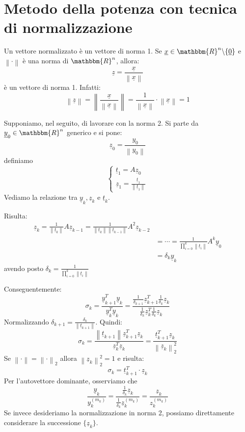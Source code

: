\documentclass[12pt]{report}
\begin{document}
\section{Metodo della potenza con tecnica di normalizzazione}
\begin{note}{}{}
Un vettore normalizzato è un vettore di norma 1. Se $\underline{x} \in \mathbbm{R}^n \backslash \{\underline{0}\}$ e $\left\|\cdot\right\|$ è una norma di $\mathbbm{R}^n$, allora:
\[
\underline{z} = \frac{\underline{x}}{\left\|\underline{x}\right\|}
\]
è un vettore di norma 1. Infatti:
\[
\left\|\underline{z}\right\| = \left\|\frac{\underline{x}}{\left\|\underline{x}\right\|}\right\| = \frac{1}{\left\|\underline{x}\right\|}\cdot \left\|\underline{x}\right\| = 1
\]
\end{note}
Supponiamo, nel seguito, di lavorare con la norma 2. Si parte da $\underline{y}_0 \in \mathbbm{R}^n$ generico e si pone:
\[
\underline{z}_0 = \frac{y_0}{\left\|y_0\right\|}
\]
definiamo
\[
\begin{cases}
	\underline{t}_1 = A\underline{z}_0 \\
	\underline{z}_1 = \frac{\underline{t}_1}{\left\|\underline{t}_1\right\|}
\end{cases}
\]
Vediamo la relazione tra $\underline{y}_k, \underline{z}_k$ e $\underline{t}_k$.

Risulta:
\begin{align*}
	\underline{z}_k = \frac{1}{\left\|\underline{t}_k\right\|}A\underline{z}_{k-1} = \frac{1}{\left\|\underline{t}_k\right\|\left\|\underline{t}_{k-1}\right\|}A^2\underline{z}_{k-2} \\
	&= \cdots = \frac{1}{\prod_{i=0}^{k}\left\|\underline{t}_i\right\|}A^k\underline{y}_0 \\
	&= \delta_k\underline{y}_k
\end{align*}
avendo posto $\delta_k = \frac{1}{\prod_{i=0}^{k}\left\|\underline{t}_i\right\|}$

Conseguentemente:
\[
\sigma_k = \frac{\underline{y}_{k+1}^T\underline{y}_k}{\underline{y}_k^T\underline{y}_k} = \frac{\frac{1}{\delta_{k+1}}\underline{z}_{k+1}^T \frac{1}{\delta_k}\underline{z}_k}{\frac{1}{\delta_k}\underline{z}_k^T \frac{1}{\delta_k}\underline{z}_k}
\]
Normalizzando $\delta_{k+1} = \frac{\delta_k}{\left\|\underline{t}_{k+1}\right\|}$. Quindi:
\[
\sigma_k = \frac{\left\|\underline{t}_{k+1}\right\|\underline{z}_{k+1}^T\underline{z}_k}{\underline{z}_k^T\underline{z}_k} = \frac{\underline{t}_{k+1}^T\underline{z}_k}{\left\|\underline{z}_k\right\|_2^2}
\]
Se $\left\|\cdot\right\| = \left\|\cdot\right\|_2$ allora $\left\|\underline{z}_k\right\|_2^2 = 1$ e risulta:
\[
\sigma_k = \underline{t}_{k+1}^T\cdot\underline{z}_k
\]
Per l'autovettore dominante, osserviamo che
\[
\frac{\underline{y}_k}{y_k^{(m_k)}} = \frac{\frac{1}{\delta_k}\underline{z}_k}{\frac{1}{\delta_k}\underline{z}_k^{(m_k)}} = \frac{\underline{z}_k}{z_k^{(m_k)}}
\]
Se invece desideriamo la normalizzazione in norma 2, possiamo direttamente considerare la successione $\{\underline{z}_k\}$.
\end{document}
